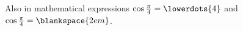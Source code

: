 Also in mathematical expressions
$\cos\frac\pi4 = \lowerdots{4}$
and $\cos\frac\pi4 = \blankspace{2em}$.
